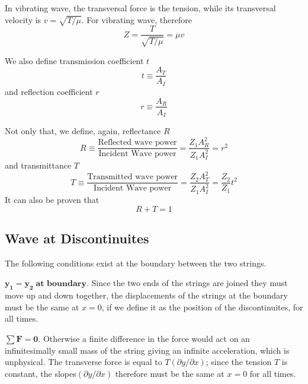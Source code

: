 \documentclass[../../../main.tex]{subfiles}
\begin{document}
In vibrating wave, the transversal force is the tension, while its transversal velocity is $v=\sqrt{T/\mu}$. For vibrating wave, therefore
\begin{equation*}
    Z=\frac{T}{\sqrt{T/\mu}}=\mu v
\end{equation*}

We also define transmission coefficient $t$ 
\begin{equation*}
    t\equiv\frac{A_T}{A_I}
\end{equation*}
and reflection coefficient $r$
\begin{equation*}
    r\equiv\frac{A_R}{A_I}
\end{equation*}

Not only that, we define, again, reflectance $R$
\begin{equation*}
    R\equiv\frac{\text{Reflected wave power}}{\text{Incident Wave power}}=\frac{Z_1A_R^2}{Z_1A_I^2}=r^2
\end{equation*} 
and transmittance $T$
\begin{equation*}
    T\equiv\frac{\text{Transmitted wave power}}{\text{Incident Wave power}}=\frac{Z_2A_T^2}{Z_1A_I^2}=\frac{Z_2}{Z_1}t^2
\end{equation*}
It can also be proven that
\begin{equation*}
    R+T=1
\end{equation*}

\subsection{Wave at Discontinuites}
The following conditions exist at the boundary between the two strings.

$\mathbf{y_1=y_2\; \textbf{at boundary}.}$ Since the two ends of the strings are joined they must move up and down together, the displacements of the strings at the boundary must be the same at $x = 0$, if we define it as the position of the discontinuites, for all times. 

$\mathbf{\sum F=0.}$ Otherwise a finite difference in the force would act on an infinitesimally small mass of the string giving an infinite acceleration, which is unphysical. The transverse force is equal to $T (\partial y/\partial x)$; since the tension $T$ is constant, the slopes$ (\partial y/\partial x)$ therefore must be the same at $x = 0$ for all times.
\end{document}
